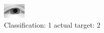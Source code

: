 \begin{figure}[h!]
\begin{center}
\includegraphics[width=0.60\columnwidth]{figures/ID2371_class_1_target_2.png}
\end{center}
\caption{ Classification: 1 actual target: 2}
\label{fig:ID2371_class_1_target_2}
\end{figure}
